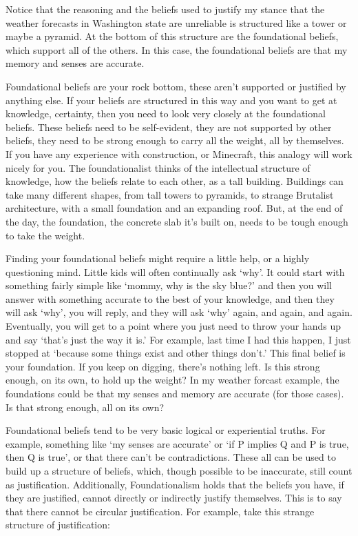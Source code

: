 Notice that the reasoning and the beliefs used to justify my stance that the weather forecasts in Washington state are unreliable is structured like a tower or maybe a pyramid. At the bottom of this structure are the foundational beliefs, which support all of the others. In this case, the foundational beliefs are that my memory and senses are accurate. 

Foundational beliefs are your rock bottom, these aren't supported or justified by anything else. If your beliefs are structured in this way and you want to get at knowledge, certainty, then you need to look very closely at the foundational beliefs. These beliefs need to be self-evident, they are not  supported by other beliefs, they need to be strong enough to carry all the weight, all by themselves.  If you have any experience with construction, or Minecraft, this analogy will work nicely for you. The foundationalist thinks of the intellectual structure of knowledge, how the beliefs relate to each other, as a tall building. Buildings can take many different shapes, from tall towers to pyramids, to strange Brutalist architecture, with a small foundation and an expanding roof. But, at the end of the day, the foundation, the concrete slab it's built on, needs to be tough enough to take the weight. 

Finding your foundational beliefs might require a little help, or a highly questioning mind. Little kids will often continually ask `why'. It could start with something fairly simple like `mommy, why is the sky blue?' and then you will answer with something accurate to the best of your knowledge, and then they will ask `why', you will reply, and they will ask `why' again, and again, and again. Eventually, you will get to a point where you just need to throw your hands up and say `that's just the way it is.' For example, last time I had this happen, I just stopped at `because some things exist and other things don't.' This final belief is your foundation. If you keep on digging, there's nothing left. Is this strong enough, on its own, to hold up the weight? In my weather forcast example, the foundations could be that my senses and memory are accurate (for those cases). Is that strong enough, all on its own? 

Foundational beliefs tend to be very basic logical or experiential truths. For example, something like `my senses are accurate' or `if P implies Q and P is true, then Q is true', or that there can't be contradictions. These all can be used to build up a structure of beliefs, which, though possible to be inaccurate, still count as justification. Additionally, Foundationalism holds that the beliefs you have, if they are justified, cannot directly or indirectly justify themselves. This is to say that there cannot be circular justification. For example, take this strange structure of justification:

